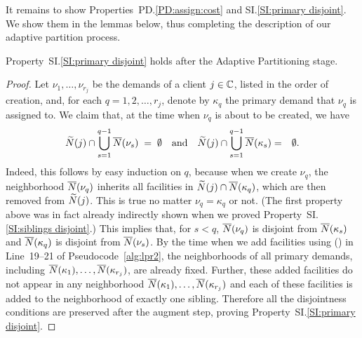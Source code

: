 \documentclass[11pt]{article}
\begin{document}
It remains to show Properties~PD.\ref{PD:assign:cost} and
SI.\ref{SI:primary disjoint}. We show them in the lemmas
below, thus completing the description of our adaptive
partition process.



\begin{lemma}\label{lem: property SI:primary disjoint holds}
  Property~SI.\ref{SI:primary disjoint} holds after the
  Adaptive Partitioning stage.
\end{lemma}
\begin{proof}
  Let $\nu_1,\ldots,\nu_{r_j}$ be the demands of a client
  $j\in\mathbb{C}$, listed in the order of creation, and,
  for each $q=1,2,\ldots,r_j$, denote by $\kappa_q$ the primary
  demand that $\nu_q$ is assigned to.  We claim that, at the
  time when $\nu_q$ is about to be created, we have
%
\begin{eqnarray*}
{\widetilde N}(j) \cap \bigcup_{s=1}^{q-1} {\overline{N}}(\nu_s) \;=\; \emptyset \quad\textrm{and} \quad
{\widetilde N}(j) \cap \bigcup_{s=1}^{q-1} {\overline{N}}(\kappa_s) &=& \emptyset.
\end{eqnarray*}
%
Indeed, this follows by easy induction on $q$, because when
we create $\nu_q$, the neighborhood ${\overline{N}}(\nu_q)$ inherits
all facilities in ${\widetilde N}(j)\cap {\overline{N}}(\kappa_q)$, which
are then removed from ${\widetilde N}(j)$. This is true no matter
$\nu_q = \kappa_q$ or not.  (The first property above was in
fact already indirectly shown when we proved
Property~SI.\ref{SI:siblings disjoint}.) This implies that,
for $s < q$, ${\overline{N}}(\nu_q)$ is disjoint from
${\overline{N}}(\kappa_s)$ and ${\overline{N}}(\kappa_q)$ is disjoint from
${\overline{N}}(\nu_s)$. By the time when we add facilities using
\AugmentToUnit() in Line~19--21 of
Pseudocode~\ref{alg:lpr2}, the neighborhoods of all primary
demands, including ${\overline{N}}(\kappa_1), \ldots,
{\overline{N}}(\kappa_{r_j})$, are already fixed. Further, these
added facilities do not appear in any neighborhood
${\overline{N}}(\kappa_1), \ldots, {\overline{N}}(\kappa_{r_j})$ and each of
these facilities is added to the neighborhood of exactly one
sibling.  Therefore all the disjointness conditions are
preserved after the augment step, proving
Property~SI.\ref{SI:primary disjoint}.
\end{proof}
\end{document}
